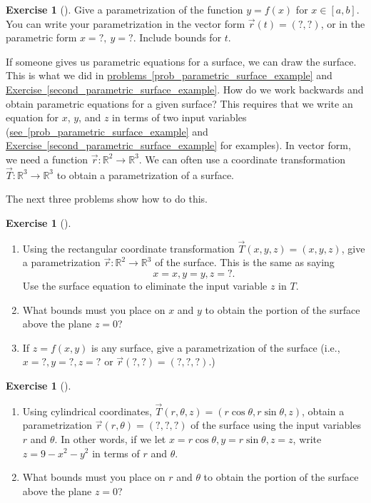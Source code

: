 \documentclass[10pt,]{book}
\theoremstyle{plain}
\theoremstyle{definition}
\theoremstyle{definition}
\theoremstyle{definition}
\theoremstyle{definition}
\newtheorem{exploration}[project]{Exercise}
\theoremstyle{definition}
\numberwithin{equation}{section}
\begin{document}
\begin{exploration}[]\label{exploration-124}
Give a parametrization of the function \(y=f(x)\) for \(x\in[a,b]\). You can write your parametrization in the vector form \(\vec r(t)=(?,?)\), or in the parametric form \(x=?,\ y=?\). Include bounds for \(t\).%
\end{exploration}
If someone gives us parametric equations for a surface, we can draw the surface. This is what we did in \hyperref[prob_parametric_surface_example]{problems~\ref{prob_parametric_surface_example}} and \hyperref[second_parametric_surface_example]{Exercise~\ref{second_parametric_surface_example}}. How do we work backwards and obtain parametric equations for a given surface? This requires that we write an equation for \(x\), \(y\), and \(z\) in terms of two input variables (\hyperref[prob_parametric_surface_example]{see~\ref{prob_parametric_surface_example}} and \hyperref[second_parametric_surface_example]{Exercise~\ref{second_parametric_surface_example}} for examples). In vector form, we need a function \(\vec r\colon \mathbb{R}^2\to\mathbb{R}^3\). We can often use a coordinate transformation \(\vec T\colon \mathbb{R}^3\to\mathbb{R}^3\) to obtain a parametrization of a surface.%
\par
The next three problems show how to do this.%
\begin{exploration}[]\label{x3d_parametric_plot}
\leavevmode%
\begin{enumerate}[font=\bfseries,label=(\alph*),ref=\alph*]
\item\label{task-247} Using the rectangular coordinate transformation \(\vec T(x,y,z)=(x,y,z)\), give a parametrization \(\vec r\colon \mathbb{R}^2\to\mathbb{R}^3\) of the surface. This is the same as saying%
\begin{equation*}
x=x, y=y, z=?.
\end{equation*}
Use the surface equation to eliminate the input variable \(z\) in \(T\).%
%
\item\label{task-248} What bounds must you place on \(x\) and \(y\) to obtain the portion of the surface above the plane \(z=0\)?%
\item\label{task-249} If \(z=f(x,y)\) is any surface, give a parametrization of the surface (i.e., \(x=?, y=?, z=?\) or \(\vec r (?,?)=(?,?,?)\).)%
\end{enumerate}
\end{exploration}
\begin{exploration}[]\label{exploration-126}
\leavevmode%
\begin{enumerate}[font=\bfseries,label=(\alph*),ref=\alph*]
\item\label{task-250} Using cylindrical coordinates, \(\vec T(r,\theta,z) = (r\cos \theta, r\sin\theta, z)\), obtain a parametrization \(\vec r(r,\theta)=(?,?,?)\) of the surface using the input variables \(r\) and \(\theta\). In other words, if we let \(x=r\cos \theta, y=r\sin\theta, z=z\), write \(z=9-x^2-y^2\) in terms of \(r\) and \(\theta\).%
\item\label{task-251} What bounds must you place on \(r\) and \(\theta\) to obtain the portion of the surface above the plane \(z=0\)?%
\end{enumerate}
\end{exploration}
\end{document}
